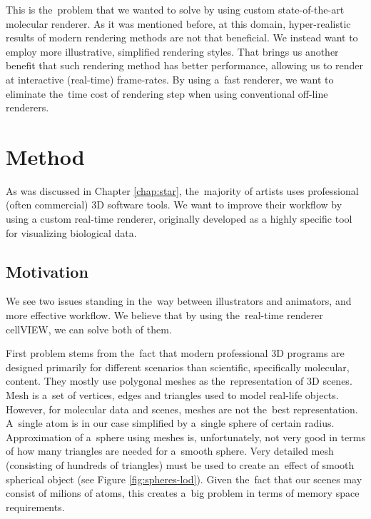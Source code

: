 \documentclass[
  digital, %
  table,   %
  nolof,     %
  nolot,     %
  oneside,
]{fithesis3}
\begin{document}
This is the problem that we wanted to solve by using custom state-of-the-art molecular renderer. As it was mentioned before, at this domain, hyper-realistic results of modern rendering methods are not that beneficial. We instead want to employ more illustrative, simplified rendering styles. That brings us another benefit that such rendering method has better performance, allowing us to render at interactive (real-time) frame-rates. By using a fast renderer, we want to eliminate the time cost of rendering step when using conventional off-line renderers.

\chapter{Method}
\label{chap:method}
As was discussed in Chapter \ref{chap:star}, the majority of artists uses professional (often commercial) 3D software tools. We want to improve their workflow by using a custom real-time renderer, originally developed as a highly specific tool for visualizing biological data.


\section{Motivation}
We see two issues standing in the way between illustrators and animators, and more effective workflow. We believe that by using the real-time renderer cellVIEW, we can solve both of them.

First problem stems from the fact that modern professional 3D programs are designed primarily for different scenarios than scientific, specifically molecular, content. They mostly use polygonal meshes as the representation of 3D scenes. Mesh is a set of vertices, edges and triangles used to model real-life objects. However, for molecular data and scenes, meshes are not the best representation. A single atom is in our case simplified by a single sphere of certain radius. Approximation of a sphere using meshes is, unfortunately, not very good in terms of how many triangles are needed for a smooth sphere. Very detailed mesh (consisting of hundreds of triangles) must be used to create an effect of smooth spherical object (see Figure \ref{fig:spheres-lod}). Given the fact that our scenes may consist of milions of atoms, this creates a big problem in terms of memory space requirements.
\end{document}
